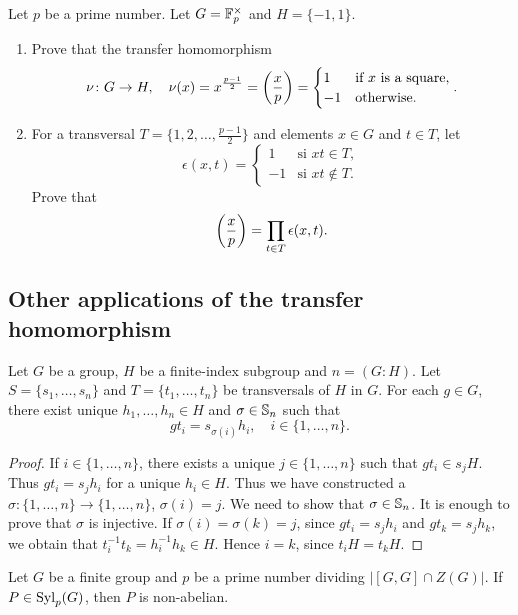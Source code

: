 \begin{exercise}
	Let $p$ be a prime number. Let $G=\mathbb{F}_p^\times$ and $H=\{-1,1\}$. 
    \begin{enumerate} 
    \item Prove that the transfer homomorphism 
	\[
		\nu\colon G\to H,\quad
		\nu(x)=x^{\frac{p-1}{2}}=\left(\frac{x}{p}\right)=\begin{cases}
			1 & \text{if $x$ is a square},\\
			-1 & \text{otherwise}.
		\end{cases}.
	\]
	\item For a transversal $T=\{1,2,\dots,\frac{p-1}{2}\}$ and elements $x\in G$ and $t\in T$, let 
 	\[
	\epsilon(x,t)=\begin{cases}
		1 & \text{si $xt\in T$},\\
		-1 & \text{si $xt\not\in T$}.
	\end{cases}
	\]
	Prove that  
	\[
	\left(\frac{x}{p}\right)=\prod_{t\in T}\epsilon(x,t).
	\]
    \end{enumerate}
\end{exercise}

\subsection{Other applications of the transfer homomorphism}

\begin{lemma}
	\label{lem:sigma}
	Let $G$ be a group, $H$ be a finite-index subgroup and $n=(G:H)$. 
    Let $S=\{s_1,\dots,s_n\}$ and $T=\{t_1,\dots,t_n\}$ be transversals of $H$ in $G$. 
    For each $g\in G$, there exist unique $h_1,\dots,h_n\in H$ and 
	$\sigma\in\mathbb{S}_n$ such that 
	\[
		gt_i=s_{\sigma(i)}h_i,\quad
		i\in\{1,\dots,n\}.
	\]
\end{lemma}

\begin{proof}
	If $i\in\{1,\dots,n\}$, there exists  a unique $j\in\{1,\dots,n\}$ such that 
    $gt_i\in
	s_jH$. Thus $gt_i=s_jh_i$ for a unique $h_i\in H$. Thus we have constructed a 
	$\sigma\colon\{1,\dots,n\}\to\{1,\dots,n\}$, $\sigma(i)=j$.  We need to show that 
	$\sigma\in\mathbb{S}_n$. It is enough to prove that $\sigma$ is injective. If
	$\sigma(i)=\sigma(k)=j$, since $gt_i=s_jh_i$ and $gt_k=s_jh_k$, we obtain that 
	$t_i^{-1}t_k=h_i^{-1}h_k\in H$. Hence $i=k$, since $t_iH=t_kH$.
\end{proof}


\begin{theorem}
	\label{thm:P_nonabelian}
	Let $G$ be a finite group and $p$ be a prime number dividing $|[G,G]\cap
	Z(G)|$. If $P\in\mathrm{Syl}_p(G)$, then $P$ is non-abelian. 
\end{theorem}

